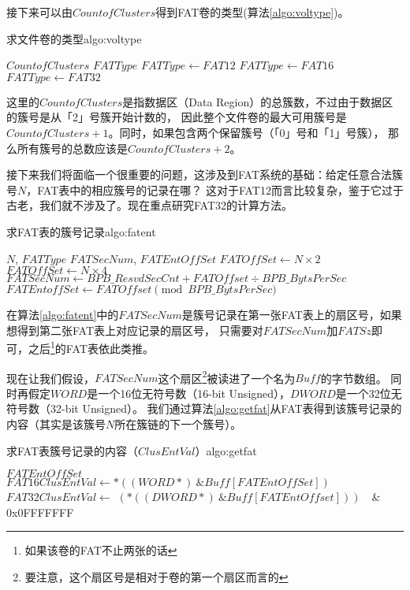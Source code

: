 接下来可以由$CountofClusters$得到FAT卷的类型(算法\ref{algo:voltype})。
\begin{balgo}{求文件卷的类型}{algo:voltype}
\begin{algorithmic}
\Require $CountofClusters$
\Ensure $FATType$
    \State $FATType \gets FAT12$  
    \State $FATType \gets FAT16$ 
\Else
    \State $FATType \gets FAT32$ 
\EndIf
\end{algorithmic}
\end{balgo}

这里的$CountofClusters$是指数据区（Data Region）的总簇数，不过由于数据区的簇号是从「2」号簇开始计数的，
因此整个文件卷的最大可用簇号是$CountofClusters + 1$。同时，如果包含两个保留簇号（「0」号和「1」号簇），
那么所有簇号的总数应该是$CountofClusters + 2$。

接下来我们将面临一个很重要的问题，这涉及到FAT系统的基础：给定任意合法簇号$N$，FAT表中的相应簇号的记录在哪？
这对于FAT12而言比较复杂，鉴于它过于古老，我们就不涉及了。现在重点研究FAT32的计算方法。
\begin{balgo}{求FAT表的簇号记录}{algo:fatent}
\begin{algorithmic}
\Require $N$, $FATType$
\Ensure $FATSecNum$,  $FATEntOffSet$
    \State $FATOffSet \gets N \times 2$
\Else
    \State $FATOffSet \gets N \times 4$
\EndIf
\State $FATSecNum \gets BPB\_ResvdSecCnt + FATOffset \div BPB\_BytsPerSec$
\State $FATEntoffSet \gets FATOffset \pmod{BPB\_BytsPerSec}$
\end{algorithmic}
\end{balgo}

在算法\ref{algo:fatent}中的$FATSecNum$是簇号记录在第一张FAT表上的扇区号，如果想得到第二张FAT表上对应记录的扇区号，
只需要对$FATSecNum$加$FATSz$即可，之后\footnote{如果该卷的FAT不止两张的话}的FAT表依此类推。

现在让我们假设，$FATSecNum$这个扇区\footnote{要注意，这个扇区号是相对于卷的第一个扇区而言的}被读进了一个名为$Buff$的字节数组。
同时再假定$WORD$是一个16位无符号数（16-bit Unsigned），$DWORD$是一个32位无符号数（32-bit Unsigned）。
我们通过算法\ref{algo:getfat}从FAT表得到该簇号记录的内容（其实是该簇号$N$所在簇链的下一个簇号）。
\begin{balgo}{求FAT表簇号记录的内容（$ClusEntVal$）}{algo:getfat}
\begin{algorithmic}
\Require $FATEntOffSet$
    \State $FAT16ClusEntVal \gets *((WORD*)\ \&Buff[FATEntOffSet])$
\Else
    \State $FAT32ClusEntVal \gets$
    \State $(*((DWORD*)\ \&Buff[FATEntOffset]))\quad\&$\quad0x0FFFFFFF
\EndIf
\end{algorithmic}
\end{balgo}

